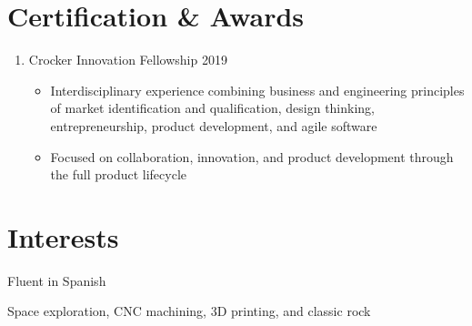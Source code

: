 \documentclass[11pt]{article} %
\begin{document}
\section{Certification \& Awards}
\begin{enumerate}[label=\null, left=0pt..0pt, itemsep=0pt]
	\item Crocker Innovation Fellowship \hfill 2019
	\begin{itemize}
		\item Interdisciplinary experience combining business and engineering principles of market identification and qualification, design thinking, entrepreneurship, product development, and agile software
		\item Focused on collaboration, innovation, and product development through the full product lifecycle
	\end{itemize}
\end{enumerate}

\section{Interests}
\begin{description}[itemsep=0pt]
	\item[Language] Fluent in Spanish
	\item[Interests] Space exploration, CNC machining, 3D printing, and classic rock
\end{description}
\end{document}
